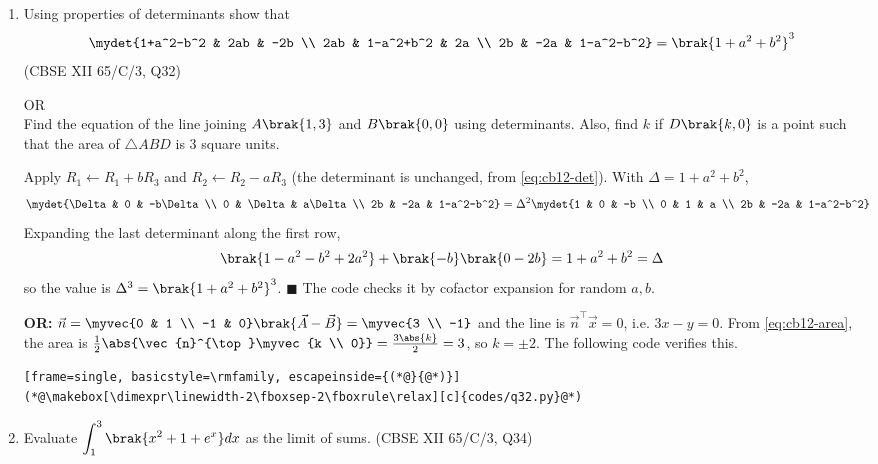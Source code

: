 \begin{enumerate}[label=\thesubsection.\arabic*, ref=\thesubsection.\theenumi,itemsep=0pt]
\item Using properties of determinants show that
\begin{align*}
\mydet{1+a^2-b^2 & 2ab & -2b \\ 2ab & 1-a^2+b^2 & 2a \\ 2b & -2a & 1-a^2-b^2} = \brak{1+a^2+b^2}^3
\end{align*}
\hfill (CBSE XII 65/C/3, Q32)

\hfill OR \\
Find the equation of the line joining $A\brak{1,3}$ and $B\brak{0,0}$ using determinants. Also, find $k$ if $D\brak{k,0}$ is a point such that the area of $\triangle ABD$ is $3$ square units.

\solution Apply $R_1 \leftarrow R_1 + bR_3$ and $R_2 \leftarrow R_2 - aR_3$ (the determinant is unchanged, from \eqref{eq:cb12-det}). With $\Delta = 1 + a^2 + b^2$,
\begin{align}
\mydet{\Delta & 0 & -b\Delta \\ 0 & \Delta & a\Delta \\ 2b & -2a & 1-a^2-b^2} &= \Delta^2\mydet{1 & 0 & -b \\ 0 & 1 & a \\ 2b & -2a & 1-a^2-b^2}
\end{align}
Expanding the last determinant along the first row,
\begin{align}
\brak{1 - a^2 - b^2 + 2a^2} + \brak{-b}\brak{0 - 2b} = 1 + a^2 + b^2 = \Delta
\end{align}
so the value is $\Delta^3 = \brak{1+a^2+b^2}^3$. $\blacksquare$ The code checks it by cofactor expansion for random $a, b$.

\textbf{OR:} $\vec{n} = \myvec{0 & 1 \\ -1 & 0}\brak{\vec{A}-\vec{B}} = \myvec{3 \\ -1}$ and the line is $\vec{n}^{\top}\vec{x} = 0$, i.e. $3x - y = 0$. From \eqref{eq:cb12-area}, the area is $\frac{1}{2}\abs{\vec{n}^{\top}\myvec{k \\ 0}} = \frac{3\abs{k}}{2} = 3$, so $k = \pm 2$. The following code verifies this.
\begin{lstlisting}[frame=single, basicstyle=\rmfamily, escapeinside={(*@}{@*)}]
(*@\makebox[\dimexpr\linewidth-2\fboxsep-2\fboxrule\relax][c]{codes/q32.py}@*)
\end{lstlisting}

\item Evaluate $\displaystyle\int_1^3\brak{x^2 + 1 + e^x}dx$ as the limit of sums.
\hfill (CBSE XII 65/C/3, Q34)


\end{enumerate}
